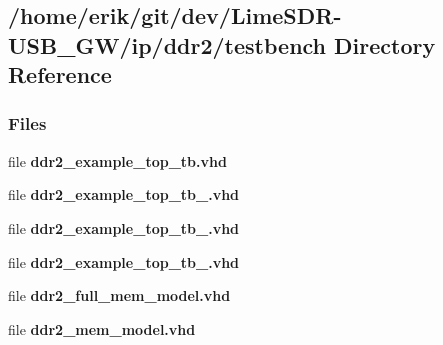 \subsection{/home/erik/git/dev/\+Lime\+S\+D\+R-\/\+U\+S\+B\+\_\+\+G\+W/ip/ddr2/testbench Directory Reference}
\label{dir_a868f92eb5f5fcf61bddbd97028e7919}
\subsubsection*{Files}
\begin{DoxyCompactItemize}
\item 
file {\bf ddr2\+\_\+example\+\_\+top\+\_\+tb.\+vhd}
\item 
file {\bf ddr2\+\_\+example\+\_\+top\+\_\+tb\+\_.\+vhd}
\item 
file {\bf ddr2\+\_\+example\+\_\+top\+\_\+tb\+\_.\+vhd}
\item 
file {\bf ddr2\+\_\+example\+\_\+top\+\_\+tb\+\_.\+vhd}
\item 
file {\bf ddr2\+\_\+full\+\_\+mem\+\_\+model.\+vhd}
\item 
file {\bf ddr2\+\_\+mem\+\_\+model.\+vhd}
\end{DoxyCompactItemize}
